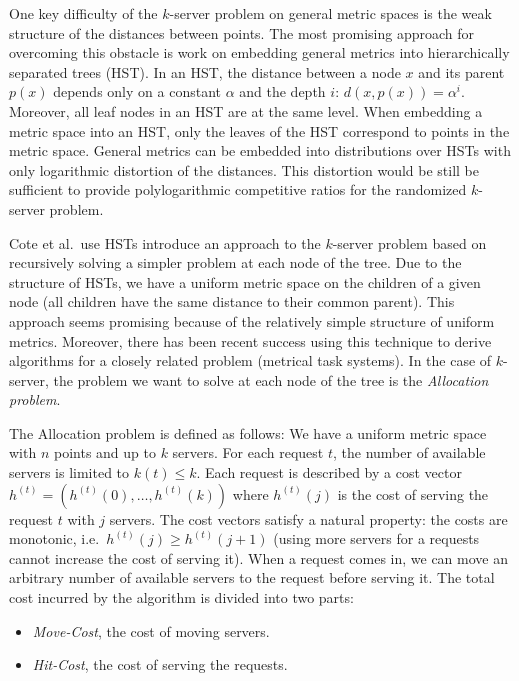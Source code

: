 One key difficulty of the $k$-server problem on general metric spaces is the weak structure of the distances between points.
The most promising approach for overcoming this obstacle is work on embedding general metrics into hierarchically separated trees (HST).
In an HST, the distance between a node $x$ and its parent $p(x)$ depends only on a constant $\alpha$ and the depth $i$: $d(x, p(x)) = \alpha^i$.
Moreover, all leaf nodes in an HST are at the same level.
When embedding a metric space into an HST, only the leaves of the HST correspond to points in the metric space.
General metrics can be embedded into distributions over HSTs with only logarithmic distortion of the distances.
This distortion would be still be sufficient to provide polylogarithmic competitive ratios for the randomized $k$-server problem.

Cote et al.\ use HSTs introduce an approach to the $k$-server problem based on recursively solving a simpler problem at each node of the tree.
Due to the structure of HSTs, we have a uniform metric space on the children of a given node (all children have the same distance to their common parent).
This approach seems promising because of the relatively simple structure of uniform metrics.
Moreover, there has been recent success using this technique to derive algorithms for a closely related problem (metrical task systems).
In the case of $k$-server, the problem we want to solve at each node of the tree is the \emph{Allocation problem}.

The Allocation problem is defined as follows:
We have a uniform metric space with $n$ points and up to $k$ servers.
For each request $t$, the number of available servers is limited to $k(t) \leq k$.
Each request is described by a cost vector $h^{(t)} = (h^{(t)}(0), \ldots, h^{(t)}(k))$ where $h^{(t)}(j)$ is the cost of serving the request $t$ with $j$ servers.
The cost vectors satisfy a natural property: the costs are monotonic, i.e.\ $h^{(t)}(j) \geq h^{(t)}(j + 1)$ (using more servers for a requests cannot increase the cost of serving it).
When a request comes in, we can move an arbitrary number of available servers to the request before serving it.
The total cost incurred by the algorithm is divided into two parts:
\begin{itemize}
\item \emph{Move-Cost}, the cost of moving servers.
\item \emph{Hit-Cost}, the cost of serving the requests.
\end{itemize}

